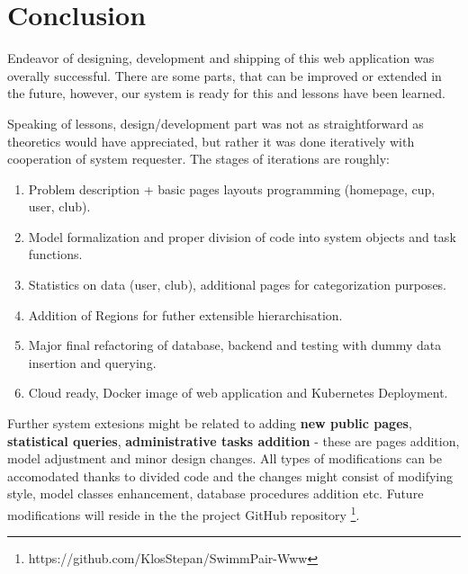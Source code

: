 \chapter*{Conclusion}
Endeavor of designing, development and shipping of this web application was overally successful. There are some parts, that can be improved or extended in the future, however, our system is ready for this and lessons have been learned.
\par
Speaking of lessons, design/development part was not as straightforward as theoretics would have appreciated, but rather it was done iteratively with cooperation of system requester.  
\newline
The stages of iterations are roughly:  
\begin{enumerate}
    \item Problem description + basic pages layouts programming (homepage, cup, user, club).
  \item Model formalization and proper division of code into system objects and task functions.
  \item Statistics on data (user, club), additional pages for categorization purposes.
  \item Addition of Regions for futher extensible hierarchisation.
  \item Major final refactoring of database, backend and testing with dummy data insertion and querying.
  \item Cloud ready, Docker image of web application and Kubernetes Deployment.
\end{enumerate}
  Further system extesions might be related to adding \textbf{new public pages}, \textbf{statistical queries}, \textbf{administrative tasks addition} -  these are pages addition, model adjustment and minor design changes. All types of modifications can be accomodated thanks to divided code and the changes might consist of modifying style, model classes enhancement, database procedures addition etc. Future modifications will reside in the the project GitHub repository \footnote{https://github.com/KlosStepan/SwimmPair-Www}.
